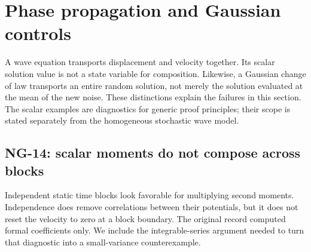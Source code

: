 \section{Phase propagation and Gaussian controls}\label{S:nogo-phase}

A wave equation transports displacement and velocity together. Its scalar
solution value is not a state variable for composition. Likewise, a
Gaussian change of law transports an entire random solution, not merely
the solution evaluated at the mean of the new noise. These distinctions
explain the failures in this section. The scalar examples are diagnostics
for generic proof principles; their scope is stated separately from the
homogeneous stochastic wave model.

\subsection{NG-14: scalar moments do not compose across blocks}
\label{S:nogo-14}

Independent static time blocks look favorable for multiplying second
moments. Independence does remove correlations between their potentials,
but it does not reset the velocity to zero at a block boundary. The
original record computed formal coefficients only. We include the
integrable-series argument needed to turn that diagnostic into a
small-variance counterexample.

